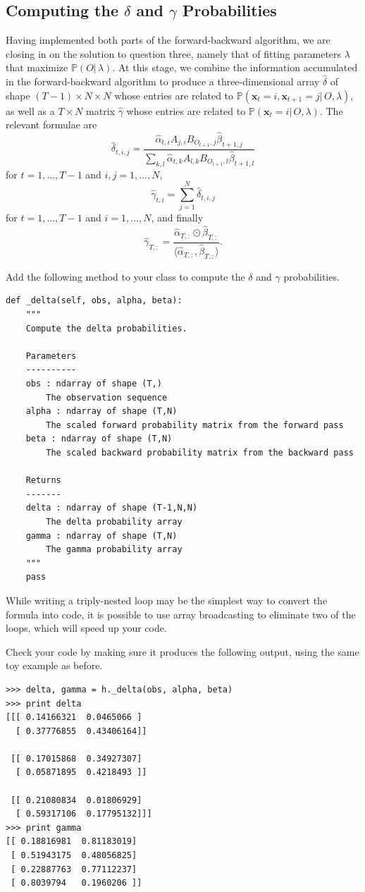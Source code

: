 \subsection*{Computing the $\delta$ and $\gamma$ Probabilities}
Having implemented both parts of the forward-backward algorithm, we are closing in on the solution to question three, namely that of fitting parameters $\lambda$ that maximize $\mathbb{P}(O | \, \lambda)$.
At this stage, we combine the information accumulated in the forward-backward algorithm to produce a three-dimensional array $\widehat{\delta}$
of shape $(T-1)\times N \times N$ whose entries are related to $\mathbb{P}(\mathbf{x}_t = i, \mathbf{x}_{t+1} = j|\, O, \lambda)$, as well as
a $T \times N$ matrix $\widehat{\gamma}$ whose entries are related to $\mathbb{P}(\mathbf{x}_t=i | \, O, \lambda)$.
The relevant formulae are
\[
\widehat{\delta}_{t,i,j} = \frac{\widehat{\alpha}_{t,i}A_{j,i}B_{O_{t+1},j}\widehat{\beta}_{t+1,j}}{\sum_{k,l}\widehat{\alpha}_{t,k}A_{l,k}B_{O_{t+1},l}\widehat{\beta}_{t+1,l}}
\]
for $t = 1, \ldots, T-1$ and $i,j = 1, \ldots, N$,
\[
\widehat{\gamma}_{t,i} = \sum_{j=1}^N \widehat{\delta}_{t,i,j}
\]
for $t = 1,\ldots,T-1$ and $i=1,\ldots,N$, and finally
\[
\widehat{\gamma}_{T,:} = \frac{\widehat{\alpha}_{T,:}\odot \widehat{\beta}_{T,:}}{\langle\widehat{\alpha}_{T,:}, \widehat{\beta}_{T,:}\rangle}.
\]

\begin{problem}
Add the following method to your class to compute the $\delta$ and $\gamma$ probabilities.
\begin{lstlisting}
def _delta(self, obs, alpha, beta):
    """
    Compute the delta probabilities.

    Parameters
    ----------
    obs : ndarray of shape (T,)
        The observation sequence
    alpha : ndarray of shape (T,N)
        The scaled forward probability matrix from the forward pass
    beta : ndarray of shape (T,N)
        The scaled backward probability matrix from the backward pass

    Returns
    -------
    delta : ndarray of shape (T-1,N,N)
        The delta probability array
    gamma : ndarray of shape (T,N)
        The gamma probability array
    """
    pass
\end{lstlisting}
While writing a triply-nested loop may be the simplest way to convert the formula into code,
it is possible to use array broadcasting to eliminate two of the loops, which will speed up your code.

Check your code by making sure it produces the following output, using the same toy example as before.
\begin{lstlisting}
>>> delta, gamma = h._delta(obs, alpha, beta)
>>> print delta
[[[ 0.14166321  0.0465066 ]
  [ 0.37776855  0.43406164]]

 [[ 0.17015868  0.34927307]
  [ 0.05871895  0.4218493 ]]

 [[ 0.21080834  0.01806929]
  [ 0.59317106  0.17795132]]]
>>> print gamma
[[ 0.18816981  0.81183019]
 [ 0.51943175  0.48056825]
 [ 0.22887763  0.77112237]
 [ 0.8039794   0.1960206 ]]
\end{lstlisting}
\end{problem}

